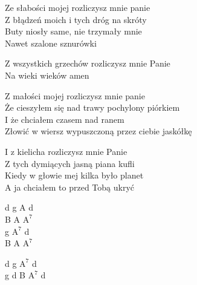\begin{text}
    Ze słabości mojej rozliczysz mnie panie\\
    Z błądzeń moich i tych dróg na skróty\\
    Buty niosły same, nie trzymały mnie\\
    Nawet szalone sznurówki

    \vin Z wszystkich grzechów rozliczysz mnie Panie\\
    \vin Na wieki wieków amen

    Z małości mojej rozliczysz mnie panie\\
    Że cieszyłem się nad trawy pochylony piórkiem\\
    I że chciałem czasem nad ranem\\
    Złowić w wiersz wypuszczoną przez ciebie jaskółkę

    I z kielicha rozliczysz mnie Panie\\
    Z tych dymiących jasną piana kufli\\
    Kiedy w głowie mej kilka było planet\\
    A ja chciałem to przed Tobą ukryć
\end{text}
\begin{chord}
    d g A d\\
    B A $\mathrm{A^{7}}$\\
    g $\mathrm{A^{7}}$ d\\
    B A $\mathrm{A^{7}}$

    d g $\mathrm{A^{7}}$ d\\
    g d B $\mathrm{A^{7}}$ d
\end{chord}
